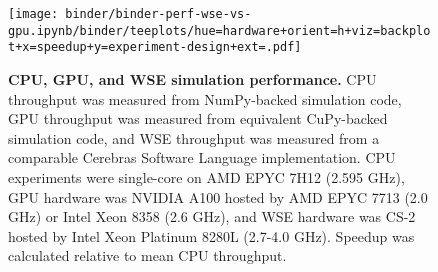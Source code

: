 \begin{figure}

\centering
\texttt{[image: binder/binder-perf-wse-vs-gpu.ipynb/binder/teeplots/hue=hardware+orient=h+viz=backplot+x=speedup+y=experiment-design+ext=.pdf]}

\vspace{-2ex}

\caption{
  \textbf{CPU, GPU, and WSE simulation performance.}
  \footnotesize
  CPU throughput was measured from NumPy-backed simulation code, GPU throughput was measured from equivalent CuPy-backed simulation code, and WSE throughput was measured from a comparable Cerebras Software Language implementation.
  CPU experiments were single-core on AMD EPYC 7H12 (2.595 GHz), GPU hardware was NVIDIA A100 hosted by AMD EPYC 7713 (2.0 GHz) or Intel Xeon 8358 (2.6 GHz), and WSE hardware was CS-2 hosted by Intel Xeon Platinum 8280L (2.7-4.0 GHz).
  Speedup was calculated relative to mean CPU throughput.
}
\label{fig:perf}
\end{figure}
